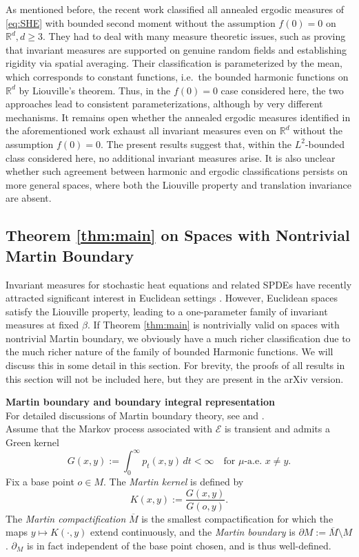 \documentclass{article}
\numberwithin{theorem}{section}
\def\text{\mbox}
\def\RR{\mathbb{R}} %
\begin{document}
As mentioned before, the recent work \cite{JKKM26} classified all annealed ergodic measures of \eqref{eq:SHE} with bounded second moment without the assumption $f(0)=0$ on $\RR^d,d\ge3$. They had to deal with many measure theoretic issues, such as proving that invariant measures are supported on genuine random fields and establishing rigidity via spatial averaging. Their classification is parameterized by the mean, which corresponds to constant functions, i.e.\ the bounded harmonic functions on $\mathbb{R}^d$ by Liouville’s theorem. Thus, in the $f(0)=0$ case considered here, the two approaches lead to consistent parameterizations, although by very different mechanisms. It remains open whether the annealed ergodic measures identified in the aforementioned work exhaust all invariant measures even on $\mathbb{R}^d$ without the assumption $f(0)=0$. The present results suggest that, within the $L^2$-bounded class considered here, no additional invariant measures arise. It is also unclear whether such agreement between harmonic and ergodic classifications persists on more general spaces, where both the Liouville property and translation invariance are absent.

\subsection{Theorem \ref{thm:main} on Spaces with Nontrivial Martin Boundary}\label{sec:martin bd}

Invariant measures for stochastic heat equations and related SPDEs have recently attracted significant interest in Euclidean settings \cite{GL20,DM24,GQ24,GHL25,COTX25}. However, Euclidean spaces satisfy the Liouville property, leading to a one-parameter family of invariant measures at fixed $\beta$. If Theorem \ref{thm:main} is nontrivially valid on spaces with nontrivial Martin boundary, we obviously have a much richer classification due to the much richer nature of the family of bounded Harmonic functions. We will discuss this in some detail in this section. For brevity, the proofs of all results in this section will not be included here, but they are present in the arXiv version.

\noindent\textbf{Martin boundary and boundary integral representation}\\
For detailed discussions of Martin boundary theory, see \cite[Ch14]{chung2005markov} and \cite[Ch7]{Pinsky_1995}.\\
Assume that the Markov process associated with $\mathcal{E}$ is transient and admits a Green kernel
\[
G(x,y):=\int_0^\infty p_t(x,y)\,dt <\infty
\quad \text{for $\mu$-a.e.\ $x\neq y$.}
\]
Fix a base point $o\in M$. The \emph{Martin kernel} is defined by
\[
K(x,y):=\frac{G(x,y)}{G(o,y)}.
\]
The \emph{Martin compactification} $\overline M$ is the smallest compactification for which the maps
$y\mapsto K(\cdot,y)$ extend continuously, and the \emph{Martin boundary} is $\partial M:=\overline M\setminus M$. $\partial_M$ is in fact independent of the base point chosen, and is thus well-defined.
\end{document}
